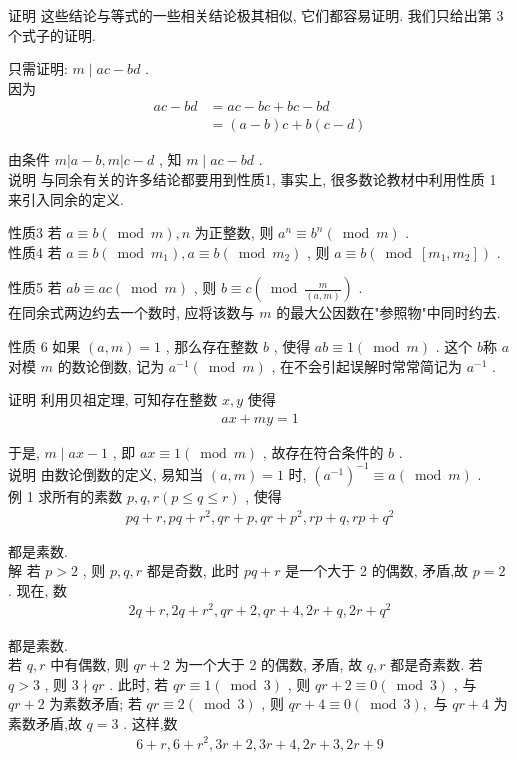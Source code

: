	证明 这些结论与等式的一些相关结论极其相似, 它们都容易证明. 我们只给出第 3 个式子的证明.

	只需证明:  $m \mid a c-b d$ . \\
	因为\begin{align}
		a c-b d & =a c-b c+b c-b d \\
		        & =(a-b) c+b(c-d)
	\end{align}

	由条件 $m|a-b, m| c-d$ , 知 $m \mid a c-b d$ . \\
	说明 与同余有关的许多结论都要用到性质1, 事实上, 很多数论教材中利用性质 1 来引入同余的定义.

	性质3 若 $a \equiv b(\bmod m), n$ 为正整数, 则 $a^{n} \equiv b^{n}(\bmod m)$ . \\
	性质4 若 $a \equiv b\left(\bmod m_{1}\right), a \equiv b\left(\bmod m_{2}\right)$ , 则 $a \equiv b\left(\bmod \left[m_{1}, m_{2}\right]\right)$ .

	性质5 若 $a b \equiv a c(\bmod m)$ , 则 $b \equiv c\left(\bmod \frac{m}{(a, m)}\right)$ . \\
	在同余式两边约去一个数时, 应将该数与 $m$ 的最大公因数在"参照物"中同时约去.

	性质 6 如果 $(a, m)=1$ , 那么存在整数 $b$ , 使得 $a b \equiv 1(\bmod m)$ . 这个 $b$称 $a$ 对模 $m$ 的数论倒数, 记为 $a^{-1}(\bmod m)$ , 在不会引起误解时常常简记为 $a^{-1}$ .

	证明 利用贝祖定理, 可知存在整数 $x ,  y$ 使得
	\begin{align*}
		a x+m y=1
	\end{align*}

	于是,  $m \mid a x-1$ , 即 $a x \equiv 1(\bmod m)$ , 故存在符合条件的 $b$ . \\
	说明 由数论倒数的定义, 易知当 $(a, m)=1$ 时,  $\left(a^{-1}\right)^{-1} \equiv a(\bmod m)$ . \\
	例 1 求所有的素数 $p ,  q ,  r(p \leqslant q \leqslant r)$ , 使得
	\begin{align*}
		p q+r, p q+r^{2}, q r+p, q r+p^{2}, r p+q, r p+q^{2}
	\end{align*}

	都是素数. \\
	解 若 $p>2$ , 则 $p ,  q ,  r$ 都是奇数, 此时 $p q+r$ 是一个大于 2 的偶数, 矛盾,故 $p=2$ . 现在, 数
	\begin{align*}
		2 q+r, 2 q+r^{2}, q r+2, q r+4,2 r+q, 2 r+q^{2}
	\end{align*}

	都是素数. \\
	若 $q ,  r$ 中有偶数, 则 $q r+2$ 为一个大于 2 的偶数, 矛盾, 故 $q ,  r$ 都是奇素数. 若 $q>3$ , 则 $3 \nmid q r$ . 此时, 若 $q r \equiv 1(\bmod 3)$ , 则 $q r+2 \equiv 0(\bmod 3)$ , 与 $q r+2$ 为素数矛盾; 若 $q r \equiv 2(\bmod 3)$ , 则 $q r+4 \equiv 0(\bmod 3) , $ 与 $q r+4$ 为素数矛盾,故 $q=3$ . 这样,数
	\begin{align*}
		6+r, 6+r^{2}, 3 r+2,3 r+4,2 r+3,2 r+9
	\end{align*}

